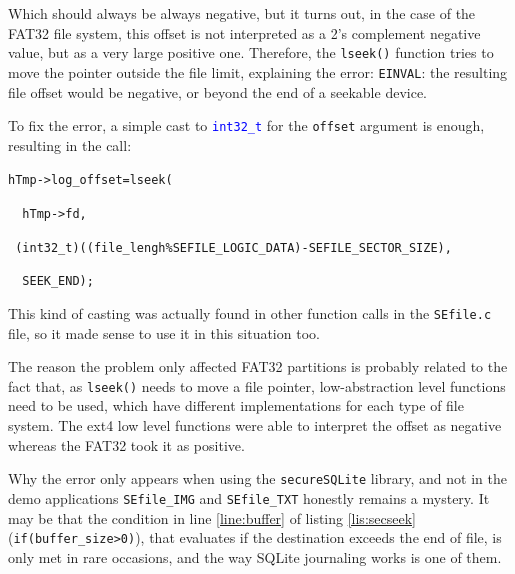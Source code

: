 Which should always be always negative, but it turns out, in the case of the FAT32 file system, this offset is not interpreted as a 2's complement negative value, but as a very large positive one. Therefore, the \texttt{lseek()} function tries to move the pointer outside the file limit, explaining the error: \texttt{EINVAL}: the resulting file offset would be negative, or beyond the end of a seekable device.

\vspace{7pt}
To fix the error, a simple cast to \texttt{\textcolor{blue}{int32\_t}} for the \texttt{offset} argument is enough, resulting in the call:
\vspace{5pt}

\lstinline|hTmp->log_offset=lseek(|

\lstinline|  hTmp->fd,| 

\lstinline| (int32_t)((file_lengh%SEFILE_LOGIC_DATA)-SEFILE_SECTOR_SIZE),| 

\lstinline|  SEEK_END);|
\vspace{7pt}

This kind of casting was actually found in other function calls in the \texttt{SEfile.c} file, so it made sense to use it in this situation too.

\vspace{7pt}
The reason the problem only affected FAT32 partitions is probably related to the fact that, as \texttt{lseek()} needs to move a file pointer, low-abstraction level functions need to be used, which have different implementations for each type of file system. The ext4 low level functions were able to interpret the offset as negative whereas the FAT32 took it as positive.

Why the error only appears when using the \texttt{secureSQLite} library, and not in the demo applications \texttt{SEfile\_IMG} and \texttt{SEfile\_TXT} honestly remains a mystery. It may be  that the condition in line \ref{line:buffer} of listing \ref{lis:secseek} (\lstinline|if(buffer_size>0)|), that evaluates if the destination exceeds the end of file, is only met in rare occasions, and the way SQLite journaling works is one of them.
